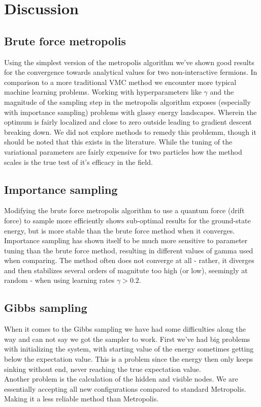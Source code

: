 \section{Discussion}
\subsection{Brute force metropolis}

Using the simplest version of the metropolis algorithm we've shown good results for the convergence towards analytical values for two non-interactive fermions. In comparison to a more traditional VMC method we encounter more typical machine learning problems. Working with hyperparameters like $\gamma$ and the magnitude of the sampling step in the metropolis algorithm exposes (especially with importance sampling) problems with glassy energy landscapes. Wherein the optimum is fairly localized and close to zero outside leading to gradient descent breaking down. We did not explore methods to remedy this problemm, though it should be noted  that this exists in the literature.  While the tuning of the variational parameters are fairly expensive for two particles how the method scales is the  true test of it's efficacy in the field. 

\subsection{Importance sampling}

Modifying the brute force metropolis algorithm to use a quantum force (drift force) to sample more
efficiently shows sub-optimal results for the ground-state energy, but is more stable than the brute
force method when it converges.
Importance sampling has shown itself to be much more sensitive to parameter tuning than the brute
force method, resulting in different values of gamma used when comparing. The method often does not
converge at all - rather, it diverges and then stabilizes several orders of magnitute too high (or low), seemingly at random - when using learning rates $\gamma > 0.2$.


\subsection{Gibbs sampling}
When it comes to the Gibbs sampling we have had some difficulties along the way and can not say we got the sampler to work.
First we've had big problems with initializing the system, with starting value of the energy sometimes getting below the expectation value. This is a problem since the energy then only keeps sinking without end, never reaching the true expectation value. \\
Another problem is the calculation of the hidden and visible nodes. We are essentially accepting all new configurations compared to standard Metropolis. Making it a less reliable method than Metropolis. 
